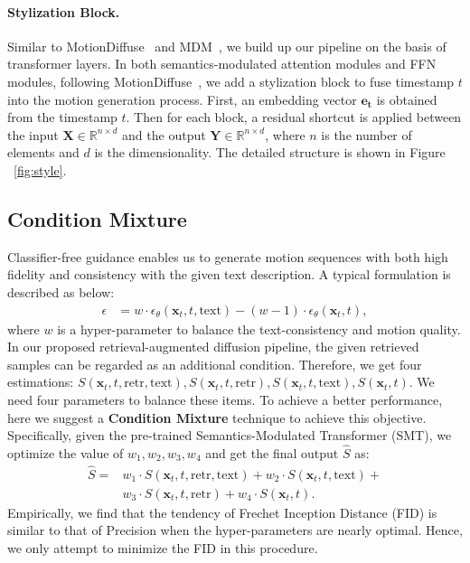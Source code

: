 \documentclass[10pt,twocolumn,letterpaper]{article}
\begin{document}
\paragraph{Stylization Block.} Similar to MotionDiffuse~\cite{zhang2022motiondiffuse} and MDM~\cite{tevet2022human}, we build up our pipeline on the basis of transformer layers. In both semantics-modulated attention modules and FFN modules, following MotionDiffuse~\cite{zhang2022motiondiffuse}, we add a stylization block to fuse timestamp $t$ into the motion generation process. First, an embedding vector $\mathbf{e_t}$ is obtained from the timestamp $t$. Then for each block, a residual shortcut is applied between the input $\mathbf{X} \in \mathbb{R}^{n \times d}$ and the output $\mathbf{Y} \in \mathbb{R}^{n \times d}$, where $n$ is the number of elements and $d$ is the dimensionality. The detailed structure is shown in Figure ~\ref{fig:style}.

\subsection{Condition Mixture}

Classifier-free guidance enables us to generate motion sequences with both high fidelity and consistency with the given text description. A typical formulation is described as below: 
\begin{equation}
\begin{aligned}
\epsilon &= w \cdot \epsilon_{\theta}(\mathbf{x}_t,t,\mathrm{text}) - (w - 1) \cdot \epsilon_{\theta}(\mathbf{x}_t,t),
\end{aligned}
\end{equation}
where $w$ is a hyper-parameter to balance the text-consistency and motion quality. In our proposed retrieval-augmented diffusion pipeline, the given retrieved samples can be regarded as an additional condition. Therefore, we get four estimations: $S(\mathbf{x}_t,t,\mathrm{retr}, \mathrm{text}), S(\mathbf{x}_t,t,\mathrm{retr}), S(\mathbf{x}_t,t,\mathrm{text}), S(\mathbf{x}_t,t)$. We need four parameters to balance these items. To achieve a better performance, here we suggest a \textbf{Condition Mixture} technique to achieve this objective. Specifically, given the pre-trained Semantics-Modulated Transformer (SMT), we optimize the value of $w_1, w_2, w_3, w_4$ and get the final output $\widehat{S}$ as: 
\begin{equation}
\label{eq:output}
\begin{aligned}
\widehat{S} =& w_1 \cdot S(\mathbf{x}_t,t,\mathrm{retr}, \mathrm{text}) + w_2 \cdot S(\mathbf{x}_t,t,\mathrm{text}) + \\
            & w_3 \cdot S(\mathbf{x}_t,t,\mathrm{retr}) + w_4 \cdot S(\mathbf{x}_t,t).
\end{aligned}
\end{equation}
Empirically, we find that the tendency of Frechet Inception Distance (FID) is similar to that of Precision when the hyper-parameters are nearly optimal. Hence, we only attempt to minimize the FID in this procedure. 
\end{document}
